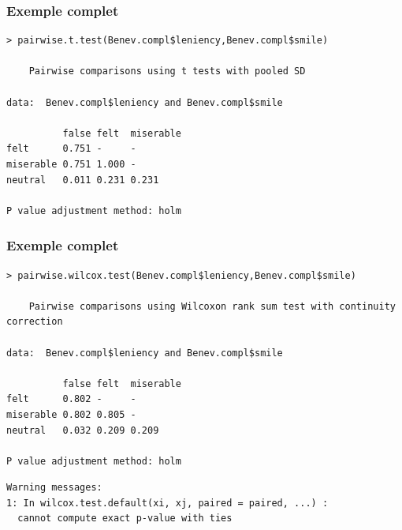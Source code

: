 \documentclass[12pt,t]{beamer}
\theoremstyle{plain}
\theoremstyle{definition}
\begin{document}
\begin{frame}[fragile]
\frametitle{Exemple complet} 

\begin{lstlisting}
> pairwise.t.test(Benev.compl$leniency,Benev.compl$smile) 

	Pairwise comparisons using t tests with pooled SD 

data:  Benev.compl$leniency and Benev.compl$smile 

          false felt  miserable
felt      0.751 -     -        
miserable 0.751 1.000 -        
neutral   0.011 0.231 0.231    

P value adjustment method: holm 
\end{lstlisting}
\end{frame}

\begin{frame}[fragile]
\frametitle{Exemple complet}\vspace*{-1ex}

\begin{lstlisting}
> pairwise.wilcox.test(Benev.compl$leniency,Benev.compl$smile) 

	Pairwise comparisons using Wilcoxon rank sum test with continuity correction 

data:  Benev.compl$leniency and Benev.compl$smile 

          false felt  miserable
felt      0.802 -     -        
miserable 0.802 0.805 -        
neutral   0.032 0.209 0.209    

P value adjustment method: holm 
\end{lstlisting}\vspace{-1.4ex}

\begin{lstlisting}[style=warning]
Warning messages:
1: In wilcox.test.default(xi, xj, paired = paired, ...) :
  cannot compute exact p-value with ties
\end{lstlisting}
\end{frame}
\end{document}
